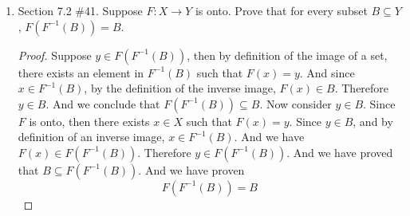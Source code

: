 \documentclass[12pt]{article}
\begin{document}
\begin{enumerate}
    \newpage
    \item Section 7.2 \#41. Suppose \( F: X \to Y \) is onto. Prove that for every subset \( B \subseteq Y \), \( F(F^{-1}(B)) = B \).
    \begin{proof}
        Suppose $y \in F(F^{-1}(B))$, then by definition of the image of a set, there exists an element in $F^{-1}(B)$ such that $F(x) = y$. And since $x \in F^{-1}(B)$, by the definition of the inverse image, $F(x) \in B$. Therefore $y \in B$. And we conclude that $ F(F^{-1}(B)) \subseteq B$. Now consider $y \in B$. Since $F$ is onto, then there exists $x \in X$ such that $F(x) = y$. Since $y \in B$, and by definition of an inverse image, $x \in F^{-1}(B)$. And we have $F(x) \in F(F^{-1}(B))$. Therefore $y \in F(F^{-1}(B))$. And we have proved that $B \subseteq F(F^{-1}(B))$. And we have proven 
        \[
        F(F^{-1}(B)) = B
        \]
    \end{proof}
    

        


    


\end{enumerate}
\end{document}

